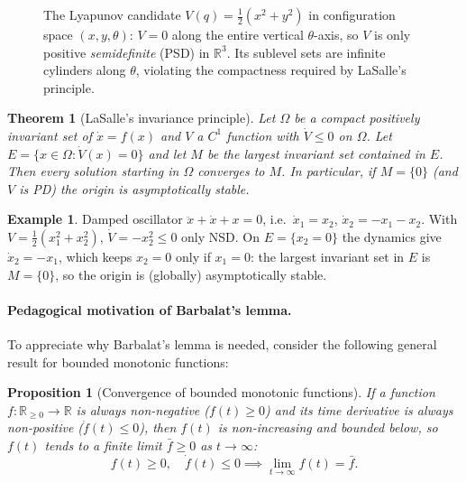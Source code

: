 \documentclass[11pt,a4paper]{article}
\def\bm#1{#1}%
\newcommand{\R}{\mathbb{R}}
\theoremstyle{definition}
\newtheorem{example}[definition]{Example}
\theoremstyle{plain}
\newtheorem{theorem}[definition]{Theorem}
\newtheorem{proposition}[definition]{Proposition}
\theoremstyle{remark}
\begin{document}
\begin{figure}[ht]
\centering
{}
\caption{The Lyapunov candidate $V(\bm q)=\frac{1}{2}(x^2+y^2)$ in configuration space $(x,y,\theta)$: $V=0$ along the entire vertical $\theta$-axis, so $V$ is only positive \emph{semidefinite} (PSD) in $\R^3$. Its sublevel sets are infinite cylinders along $\theta$, violating the compactness required by LaSalle's principle.}
\label{fig:vpsd}
\end{figure}

\begin{theorem}[LaSalle's invariance principle]\label{thm:lasalle}
Let $\Omega$ be a compact positively invariant set of $\dot{\bm x}=\bm f(\bm x)$ and $V$ a $C^1$ function with $\dot V\le0$ on $\Omega$. Let $E=\{\bm x\in\Omega:\dot V(\bm x)=0\}$ and let $M$ be the largest invariant set contained in $E$. Then every solution starting in $\Omega$ converges to $M$. In particular, if $M=\{\bm 0\}$ (and $V$ is PD) the origin is asymptotically stable.
\end{theorem}

\begin{example}\label{ex:osc}
Damped oscillator $\ddot x+\dot x+x=0$, i.e.\ $\dot x_1=x_2$, $\dot x_2=-x_1-x_2$. With $V=\frac12(x_1^2+x_2^2)$, $\dot V=-x_2^2\le0$ only NSD. On $E=\{x_2=0\}$ the dynamics give $\dot x_2=-x_1$, which keeps $x_2=0$ only if $x_1=0$: the largest invariant set in $E$ is $M=\{\bm 0\}$, so the origin is (globally) asymptotically stable.
\end{example}

\paragraph{Pedagogical motivation of Barbalat's lemma.}
To appreciate why Barbalat's lemma is needed, consider the following general result for bounded monotonic functions:
\begin{proposition}[Convergence of bounded monotonic functions]
If a function $f:\R_{\ge0}\to\R$ is always non-negative ($f(t)\ge0$) and its time derivative is always non-positive ($\dot f(t)\le0$), then $f(t)$ is non-increasing and bounded below, so $f(t)$ tends to a finite limit $\bar f\ge0$ as $t\to\infty$:
\[
f(t)\ge0,\quad \dot f(t)\le0 \implies \lim_{t\to\infty}f(t)=\bar f .
\]
\end{proposition}
\end{document}
